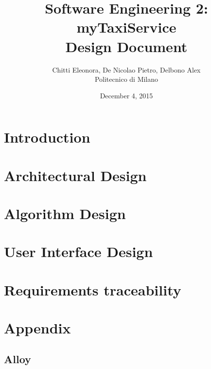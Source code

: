 \documentclass[12pt, a4paper]{report}
\begin{document}
\title{Software Engineering 2: myTaxiService \\ \vspace{1em} Design Document}
\author{Chitti Eleonora, De Nicolao Pietro, Delbono Alex\\
Politecnico di Milano}
\date{December 4, 2015}
\maketitle
\tableofcontents

\chapter{Introduction}



 


\chapter{Architectural Design}









\chapter{Algorithm Design}


\chapter{User Interface Design}

\chapter{Requirements traceability}

\appendix
\chapter{Appendix}
\section{Alloy}





\end{document}
